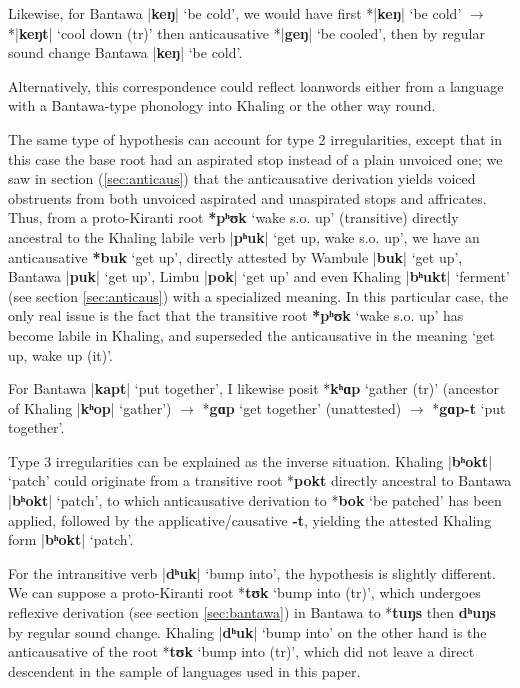 \documentclass[oneside,a4paper,11pt]{article}
\newcommand{\ipa}[1]{\textbf{{\phon\mbox{#1}}}} %
\newcommand{\dhatu}[2]{|\ipa{#1}| `#2'}
\begin{document}
Likewise, for Bantawa \dhatu{keŋ}{be cold}, we would have first *\dhatu{keŋ}{be cold} $\rightarrow$ *\dhatu{keŋt}{cool down (tr)} then anticausative *\dhatu{geŋ}{be cooled}, then by regular sound change Bantawa \dhatu{keŋ}{be cold}.
 
 Alternatively, this correspondence could reflect loanwords either from a language with a Bantawa-type phonology into Khaling or the other way round.
 
The same type of hypothesis can account for type 2 irregularities, except that in this case the base root  had an aspirated stop instead of a plain unvoiced one; we saw in section  (\ref{sec:anticaus}) that the anticausative derivation yields voiced obstruents from both unvoiced aspirated and unaspirated stops and affricates. Thus, from a proto-Kiranti root \ipa{*pʰʊk} `wake s.o. up' (transitive) directly ancestral to the Khaling labile verb \dhatu{pʰuk}{get up, wake s.o. up}, we have an anticausative \ipa{*buk} `get up', directly attested by Wambule \dhatu{buk}{get up}, Bantawa \dhatu{puk}{get up}, Limbu \dhatu{pok}{get up} and even Khaling \dhatu{bʰukt}{ferment} (see section \ref{sec:anticaus}) with a specialized meaning. In this particular case, the only real issue is the fact that the transitive root \ipa{*pʰʊk} `wake s.o. up' has become labile in Khaling, and superseded the anticausative in the meaning `get up, wake up (it)'.

For Bantawa  \dhatu{kapt}{put together}, I likewise posit *\ipa{kʰɑp} `gather (tr)' (ancestor of Khaling \dhatu{kʰop}{gather}) $\rightarrow$  *\ipa{gɑp} `get together' (unattested) $\rightarrow$  *\ipa{gɑp-t} `put together'.
 
Type 3  irregularities can be explained as the inverse situation. Khaling \dhatu{bʰokt}{patch} could originate from a transitive root *\ipa{pokt} directly ancestral to Bantawa \dhatu{bʰokt}{patch}, to which anticausative derivation to *\ipa{bok} `be patched' has been applied, followed by the applicative/causative \ipa{-t}, yielding the attested Khaling form \dhatu{bʰokt}{patch}. 

For the intransitive verb \dhatu{dʰuk}{bump into}, the hypothesis is slightly different. We can suppose a proto-Kiranti root *\ipa{tʊk} `bump into (tr)', which undergoes reflexive derivation (see section \ref{sec:bantawa}) in Bantawa to *\ipa{tuŋs} then \ipa{dʰuŋs} by regular sound change. Khaling \dhatu{dʰuk}{bump into} on the other hand is the anticausative of the root *\ipa{tʊk} `bump into (tr)', which did not leave a direct descendent in the sample of languages used in this paper.
 
\end{document}
